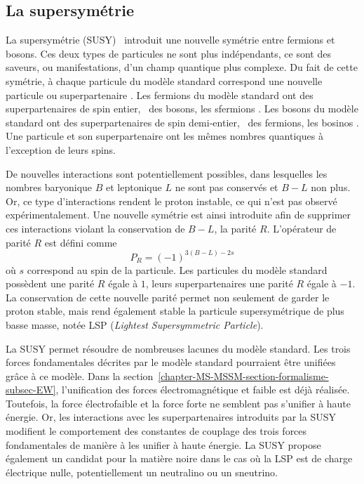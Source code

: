 \subsection{La supersymétrie}\label{chapter-MS-MSSM-section-BSM-subsec-SUSY}
La supersymétrie (SUSY)~\cite{susy_golfand,susy_wess,MARTIN_1998} introduit une nouvelle symétrie entre fermions et bosons.
Ces deux types de particules ne sont plus indépendants, ce sont des saveurs, ou manifestations, d'un champ quantique plus complexe.
Du fait de cette symétrie,
à chaque particule du modèle standard correspond une nouvelle particule ou \og superpartenaire \fg.
Les fermions du modèle standard ont des superpartenaires de spin entier, \ie\ des bosons, les \og sfermions \fg.
Les bosons du modèle standard ont des superpartenaires de spin demi-entier, \ie\ des fermions, les \og bosinos \fg.
Une particule et son superpartenaire ont les mêmes nombres quantiques à l'exception de leurs spins.
\par De nouvelles interactions sont potentiellement possibles, dans lesquelles les nombres baryonique $B$ et leptonique $L$ ne sont pas conservés et $B-L$ non plus.
Or, ce type d'interactions rendent le proton instable, ce qui n'est pas observé expérimentalement.
Une nouvelle symétrie est ainsi introduite afin de supprimer ces interactions violant la conservation de $B-L$, la parité $R$.
L'opérateur de parité $R$ est défini comme
\begin{equation}
P_R = (-1)^{3(B-L)-2s}
\end{equation}
où $s$ correspond au spin de la particule.
Les particules du modèle standard possèdent une parité $R$ égale à $1$, leurs superpartenaires une parité $R$ égale à $-1$.
La conservation de cette nouvelle parité permet non seulement de garder le proton stable, mais rend également stable la particule supersymétrique de plus basse masse, notée LSP (\emph{Lightest Supersymmetric Particle}).
\par La SUSY permet résoudre de nombreuses lacunes du modèle standard.
Les trois forces fondamentales décrites par le modèle standard pourraient être unifiées grâce à ce modèle.
Dans la section~\ref{chapter-MS-MSSM-section-formalisme-subsec-EW}, l'unification des forces électromagnétique et faible est déjà réalisée.
Toutefois, la force électrofaible et la force forte ne semblent pas s'unifier à haute énergie.
Or, les interactions avec les superpartenaires introduits par la SUSY modifient le comportement des constantes de couplage des trois forces fondamentales de manière à les unifier à haute énergie.
La SUSY propose également un candidat pour la matière noire dans le cas où la LSP est de charge électrique nulle, potentiellement un neutralino ou un sneutrino.
